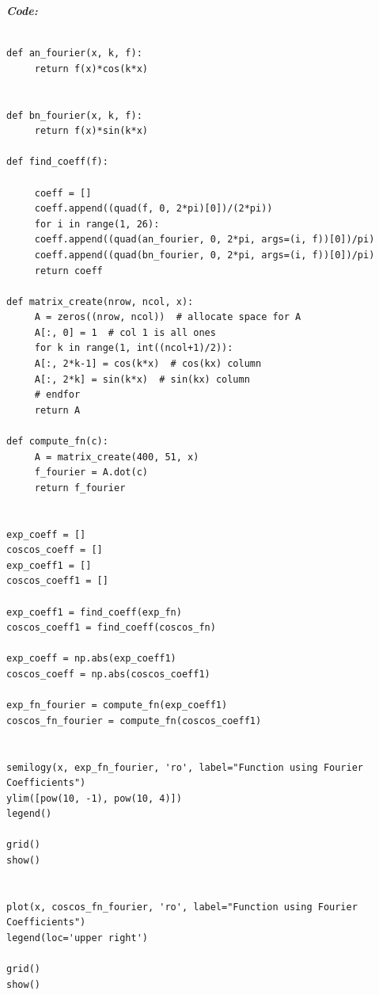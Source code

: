 \documentclass[11pt, a4paper]{article}
\begin{document}
     \textit{\textbf{Code:}}
     \begin{lstlisting}

def an_fourier(x, k, f):
     return f(x)*cos(k*x)


def bn_fourier(x, k, f):
     return f(x)*sin(k*x)

def find_coeff(f):

     coeff = []
     coeff.append((quad(f, 0, 2*pi)[0])/(2*pi))
     for i in range(1, 26):
     coeff.append((quad(an_fourier, 0, 2*pi, args=(i, f))[0])/pi)
     coeff.append((quad(bn_fourier, 0, 2*pi, args=(i, f))[0])/pi)
     return coeff

def matrix_create(nrow, ncol, x):
     A = zeros((nrow, ncol))  # allocate space for A
     A[:, 0] = 1  # col 1 is all ones
     for k in range(1, int((ncol+1)/2)):
     A[:, 2*k-1] = cos(k*x)  # cos(kx) column
     A[:, 2*k] = sin(k*x)  # sin(kx) column
     # endfor
     return A

def compute_fn(c):
     A = matrix_create(400, 51, x)
     f_fourier = A.dot(c)
     return f_fourier


exp_coeff = []
coscos_coeff = []
exp_coeff1 = []
coscos_coeff1 = []

exp_coeff1 = find_coeff(exp_fn)
coscos_coeff1 = find_coeff(coscos_fn)

exp_coeff = np.abs(exp_coeff1)
coscos_coeff = np.abs(coscos_coeff1)

exp_fn_fourier = compute_fn(exp_coeff1)
coscos_fn_fourier = compute_fn(coscos_coeff1)


semilogy(x, exp_fn_fourier, 'ro', label="Function using Fourier Coefficients")
ylim([pow(10, -1), pow(10, 4)])
legend()

grid()
show()


plot(x, coscos_fn_fourier, 'ro', label="Function using Fourier Coefficients")
legend(loc='upper right')

grid()
show()
     \end{lstlisting}
     \break
\end{document}

